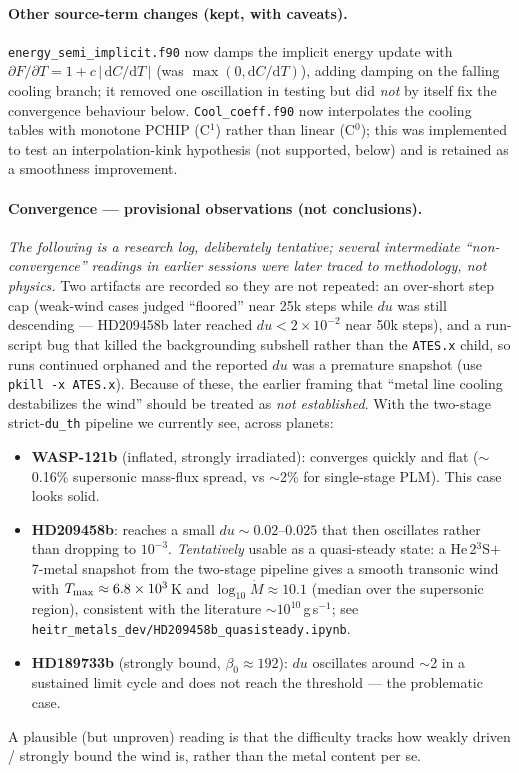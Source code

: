 \documentclass[english,a4paper]{kiseon_memo}
\begin{document}
\paragraph{Other source-term changes (kept, with caveats).}
\texttt{energy\_semi\_implicit.f90} now damps the implicit energy update with
$\partial F/\partial T = 1 + c\,|\,\mathrm dC/\mathrm dT\,|$ (was $\max(0,\mathrm
dC/\mathrm dT)$), adding damping on the falling cooling branch; it removed one
oscillation in testing but did \emph{not} by itself fix the convergence behaviour below.
\texttt{Cool\_coeff.f90} now interpolates the cooling tables with monotone PCHIP (C$^1$)
rather than linear (C$^0$); this was implemented to test an interpolation-kink
hypothesis (not supported, below) and is retained as a smoothness improvement.

\paragraph{Convergence --- provisional observations (not conclusions).}
\emph{The following is a research log, deliberately tentative; several intermediate
``non-convergence'' readings in earlier sessions were later traced to methodology, not
physics.} Two artifacts are recorded so they are not repeated: an over-short step cap
(weak-wind cases judged ``floored'' near 25k steps while $du$ was still descending ---
HD209458b later reached $du<2\times10^{-2}$ near 50k steps), and a run-script bug that
killed the backgrounding subshell rather than the \texttt{ATES.x} child, so runs
continued orphaned and the reported $du$ was a premature snapshot (use
\texttt{pkill -x ATES.x}). Because of these, the earlier framing that ``metal line
cooling destabilizes the wind'' should be treated as \emph{not established}. With the
two-stage strict-\texttt{du\_th} pipeline we currently see, across planets:
\begin{itemize}\itemsep1pt
\item \textbf{WASP-121b} (inflated, strongly irradiated): converges quickly and flat
  ($\sim$0.16\% supersonic mass-flux spread, vs $\sim$2\% for single-stage PLM). This
  case looks solid.
\item \textbf{HD209458b}: reaches a small $du\sim0.02$--$0.025$ that then oscillates
  rather than dropping to $10^{-3}$. \emph{Tentatively} usable as a quasi-steady state:
  a He\,2$^3$S$+$7-metal snapshot from the two-stage pipeline gives a smooth
  transonic wind with $T_{\rm max}\approx6.8\times10^{3}$\,K and
  $\log_{10}\dot M\approx10.1$ (median over the supersonic region), consistent with the
  literature $\sim$$10^{10}$\,g\,s$^{-1}$; see
  \texttt{heitr\_metals\_dev/HD209458b\_quasisteady.ipynb}.
\item \textbf{HD189733b} (strongly bound, $\beta_0\approx192$): $du$ oscillates around
  $\sim$2 in a sustained limit cycle and does not reach the threshold --- the
  problematic case.
\end{itemize}
A plausible (but unproven) reading is that the difficulty tracks how weakly driven /
strongly bound the wind is, rather than the metal content per se.
\end{document}
